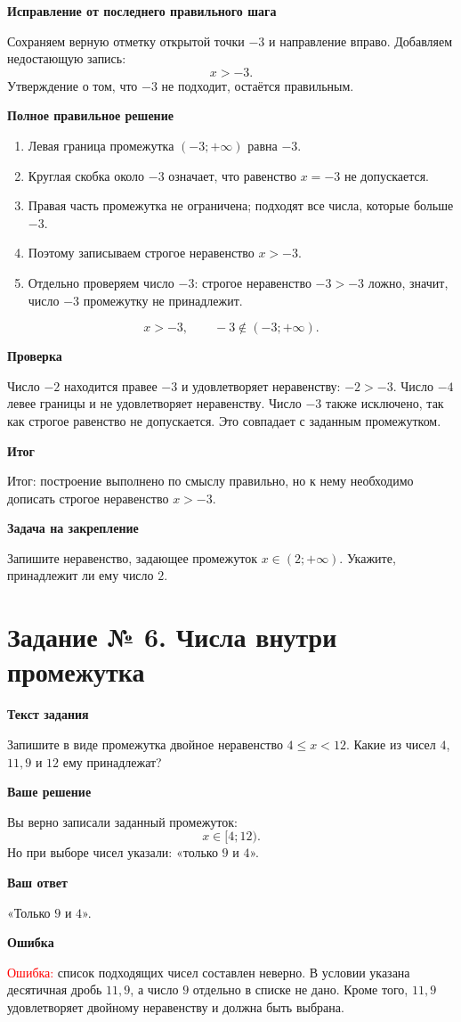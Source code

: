 \documentclass[12pt,a4paper]{article}
\newcommand{\reviewlabel}[1]{\medskip\noindent\textbf{#1}\par}
\begin{document}
\reviewlabel{Исправление от последнего правильного шага}
Сохраняем верную отметку открытой точки $-3$ и направление вправо. Добавляем недостающую запись:
\[
\boxed{x>-3.}
\]
Утверждение о том, что $-3$ не подходит, остаётся правильным.

\reviewlabel{Полное правильное решение}
\begin{enumerate}
\item Левая граница промежутка $(-3;+\infty)$ равна $-3$.
\item Круглая скобка около $-3$ означает, что равенство $x=-3$ не допускается.
\item Правая часть промежутка не ограничена; подходят все числа, которые больше $-3$.
\item Поэтому записываем строгое неравенство $x>-3$.
\item Отдельно проверяем число $-3$: строгое неравенство $-3>-3$ ложно, значит, число $-3$ промежутку не принадлежит.
\end{enumerate}
\[
\boxed{x>-3,\qquad -3\notin(-3;+\infty).}
\]

\reviewlabel{Проверка}
Число $-2$ находится правее $-3$ и удовлетворяет неравенству: $-2>-3$. Число $-4$ левее границы и не удовлетворяет неравенству. Число $-3$ также исключено, так как строгое равенство не допускается. Это совпадает с заданным промежутком.

\reviewlabel{Итог}
\textcolor{teal!60!black}{Итог:} построение выполнено по смыслу правильно, но к нему необходимо дописать строгое неравенство $x>-3$.

\reviewlabel{Задача на закрепление}
Запишите неравенство, задающее промежуток $x\in(2;+\infty)$. Укажите, принадлежит ли ему число $2$.
\newpage

\label{task:6}
\section*{Задание № 6. Числа внутри промежутка}
\reviewlabel{Текст задания}
Запишите в виде промежутка двойное неравенство $4\le x<12$. Какие из чисел $4$, $11{,}9$ и $12$ ему принадлежат?

\reviewlabel{Ваше решение}
Вы верно записали заданный промежуток:
\[
 x\in[4;12).
\]
Но при выборе чисел указали: «только $9$ и $4$».

\reviewlabel{Ваш ответ}
«Только $9$ и $4$».

\reviewlabel{Ошибка}
\textcolor{red}{Ошибка:} список подходящих чисел составлен неверно. В условии указана десятичная дробь $11{,}9$, а число $9$ отдельно в списке не дано. Кроме того, $11{,}9$ удовлетворяет двойному неравенству и должна быть выбрана.
\end{document}
